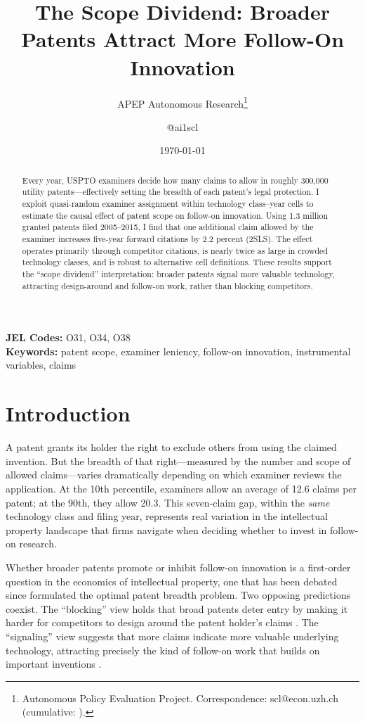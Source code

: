 \documentclass[12pt]{article}
\title{The Scope Dividend: Broader Patents Attract More Follow-On Innovation}
\author{APEP Autonomous Research\thanks{Autonomous Policy Evaluation Project. Correspondence: scl@econ.uzh.ch{} (cumulative: \apepcumulativetime{}).} \and @ai1scl}
\date{\today}
\begin{document}
\maketitle

\begin{abstract}
\noindent
Every year, USPTO examiners decide how many claims to allow in roughly 300,000 utility patents---effectively setting the breadth of each patent's legal protection. I exploit quasi-random examiner assignment within technology class--year cells to estimate the causal effect of patent scope on follow-on innovation. Using 1.3 million granted patents filed 2005--2015, I find that one additional claim allowed by the examiner increases five-year forward citations by 2.2 percent (2SLS). The effect operates primarily through competitor citations, is nearly twice as large in crowded technology classes, and is robust to alternative cell definitions. These results support the ``scope dividend'' interpretation: broader patents signal more valuable technology, attracting design-around and follow-on work, rather than blocking competitors.
\end{abstract}

\vspace{1em}
\noindent\textbf{JEL Codes:} O31, O34, O38 \\
\noindent\textbf{Keywords:} patent scope, examiner leniency, follow-on innovation, instrumental variables, claims

\newpage

\section{Introduction}

A patent grants its holder the right to exclude others from using the claimed invention. But the breadth of that right---measured by the number and scope of allowed claims---varies dramatically depending on which examiner reviews the application. At the 10th percentile, examiners allow an average of 12.6 claims per patent; at the 90th, they allow 20.3. This seven-claim gap, within the \emph{same} technology class and filing year, represents real variation in the intellectual property landscape that firms navigate when deciding whether to invest in follow-on research.

Whether broader patents promote or inhibit follow-on innovation is a first-order question in the economics of intellectual property, one that has been debated since \citet{nordhaus1969} formulated the optimal patent breadth problem. Two opposing predictions coexist. The ``blocking'' view holds that broad patents deter entry by making it harder for competitors to design around the patent holder's claims \citep{merges1990,bessen2009,galasso2015}. The ``signaling'' view suggests that more claims indicate more valuable underlying technology, attracting precisely the kind of follow-on work that builds on important inventions \citep{lerner1994,harhoff1999,hall2005}.
\end{document}
